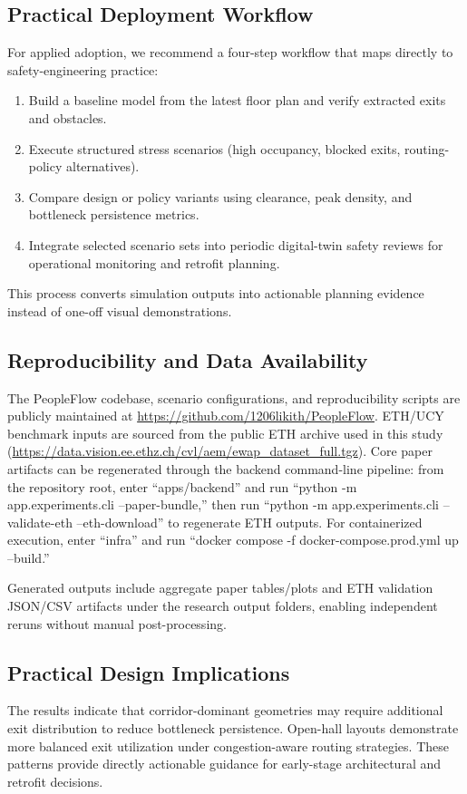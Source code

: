 \documentclass[journal]{IEEEtran}
\begin{document}
\subsection{Practical Deployment Workflow}
For applied adoption, we recommend a four-step workflow that maps directly to safety-engineering practice:
\begin{enumerate}
    \item Build a baseline model from the latest floor plan and verify extracted exits and obstacles.
    \item Execute structured stress scenarios (high occupancy, blocked exits, routing-policy alternatives).
    \item Compare design or policy variants using clearance, peak density, and bottleneck persistence metrics.
    \item Integrate selected scenario sets into periodic digital-twin safety reviews for operational monitoring and retrofit planning.
\end{enumerate}
This process converts simulation outputs into actionable planning evidence instead of one-off visual demonstrations.

\subsection{Reproducibility and Data Availability}
The PeopleFlow codebase, scenario configurations, and reproducibility scripts are publicly maintained at \url{https://github.com/1206likith/PeopleFlow}. ETH/UCY benchmark inputs are sourced from the public ETH archive used in this study (\url{https://data.vision.ee.ethz.ch/cvl/aem/ewap_dataset_full.tgz}). Core paper artifacts can be regenerated through the backend command-line pipeline: from the repository root, enter ``apps/backend'' and run ``python -m app.experiments.cli --paper-bundle,'' then run ``python -m app.experiments.cli --validate-eth --eth-download'' to regenerate ETH outputs. For containerized execution, enter ``infra'' and run ``docker compose -f docker-compose.prod.yml up --build.''

Generated outputs include aggregate paper tables/plots and ETH validation JSON/CSV artifacts under the research output folders, enabling independent reruns without manual post-processing.

\subsection{Practical Design Implications}
The results indicate that corridor-dominant geometries may require additional exit distribution to reduce bottleneck persistence. Open-hall layouts demonstrate more balanced exit utilization under congestion-aware routing strategies. These patterns provide directly actionable guidance for early-stage architectural and retrofit decisions.
\end{document}
